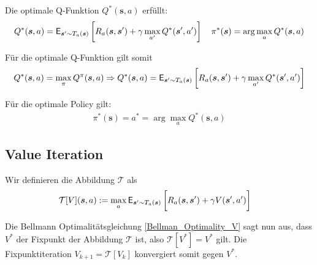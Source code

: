 \begin{satz} \label{Bellman_Optimality_Q}
    Die optimale Q-Funktion $Q^*(\bm{s}, a)$ erfüllt:
    \begin{align*}
        Q^{*}(\bm{s}, a) =
        \mathsf{E}_{\bm{s}' \sim T_a(\bm{s})}
        \left[
            \vphantom{\int}
            R_a(\bm{s}, \bm{s}') + \gamma 
            \max_{a'} Q^{*}(\bm{s}', a')
        \right]
        \quad
        \pi^{*}(\bm{s}) = \arg\max_{a} Q^{*}(\bm{s}, a)
    \end{align*}
\end{satz}

\begin{beweis}
  Für die optimale Q-Funktion gilt somit
  \begin{align*}
      Q^{*}(\bm{s}, a) 
      =
      \max_{\pi} Q^{\pi}(\bm{s}, a)
      \Rightarrow
      Q^{*}(\bm{s}, a) =
      \mathsf{E}_{\bm{s}' \sim T_a(\bm{s})}
      \left[
          \vphantom{\int}
          R_a(\bm{s}, \bm{s}') + \gamma 
          \max_{a'} Q^{*}(\bm{s}', a')
      \right]
  \end{align*}

  Für die optimale Policy gilt:
  \begin{align*}
      \pi^{*}(\bm{s}) = a^* = \arg\max_{a} Q^{*}(\bm{s}, a)
  \end{align*}
\end{beweis}

\subsection{Value Iteration}

Wir definieren die Abbildung $\mathcal{T}$ als
\begin{align*}
    \mathcal{T}[V](\bm{s}, a)
    &:=
    \max_{a}
    \mathsf{E}_{\bm{s}' \sim T_a(\bm{s})}
    \left[
        \vphantom{\int}
        R_a(\bm{s}, \bm{s}') + \gamma 
        V(\bm{s}', a')
    \right]
\end{align*}

Die Bellmann Optimalitätsgleichung \ref{Bellman_Optimality_V} sagt nun aus, 
dass $V^*$ der Fixpunkt der Abbildung $\mathcal{T}$ ist, 
also $\mathcal{T}[V^*] = V^*$ gilt. 
Die Fixpunktiteration $V_{k+1} = \mathcal{T}[V_k]$ konvergiert somit gegen $V^*$.
%

